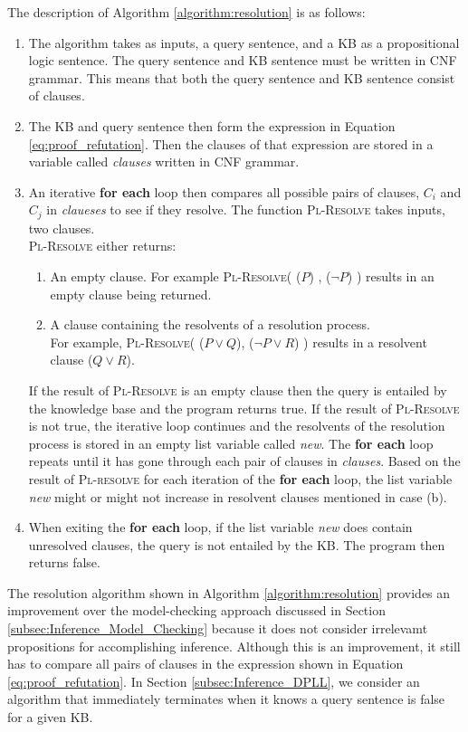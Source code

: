 The description of Algorithm \ref{algorithm:resolution} is as follows:
\begin{enumerate}
\item The algorithm takes as inputs, a query sentence, and a KB as a propositional logic sentence. The query sentence and KB sentence must be written in CNF grammar. This means that both the query sentence and KB sentence consist of clauses.
\item The KB and query sentence then form the expression in Equation \ref{eq:proof_refutation}. Then the clauses of that expression are stored in a variable called \textit{clauses} written in CNF grammar. 

\item An iterative \textbf{for each} loop then compares all possible pairs of clauses, $C_i$ and $C_j$ in \textit{claueses} to see if they resolve. The function \textsc{Pl-Resolve} takes inputs, two clauses. \\ \textsc{Pl-Resolve} either returns:

\begin{enumerate}
\item An empty clause. For example \textsc{Pl-Resolve}( ($P$) , ($\neg P$) ) results in an empty clause being returned.
\item A clause containing the resolvents of a resolution process.\\ For example, \textsc{Pl-Resolve}( ($P \vee Q$), ($\neg P \vee R$) ) results in a resolvent clause ($Q \vee R$).
\end{enumerate}

If the result of \textsc{Pl-Resolve} is an empty clause then the query is entailed by the knowledge base and the program returns true.
If the result of \textsc{Pl-Resolve} is not true, the iterative loop continues and the resolvents of the resolution process is stored in an empty list variable called \textit{new}. The \textbf{for each} loop repeats until it has gone through each pair of clauses in \textit{clauses}. Based on the result of \textsc{Pl-resolve} for each iteration of the \textbf{for each} loop, the list variable \textit{new} might or might not increase in resolvent clauses mentioned in case (b).
\item When exiting the \textbf{for each} loop, if the list variable \textit{new} does contain unresolved clauses, the query is not entailed by the KB. The program then returns false.
\end{enumerate}

The resolution algorithm shown in Algorithm \ref{algorithm:resolution} provides an improvement over the model-checking approach discussed in Section \ref{subsec:Inference_Model_Checking} because it does not consider irrelevamt propositions for accomplishing inference. Although this is an improvement, it still has to compare all pairs of clauses in the expression shown in Equation \ref{eq:proof_refutation}. In Section \ref{subsec:Inference_DPLL}, we consider an algorithm that immediately terminates when it knows a query sentence is false for a given KB.


